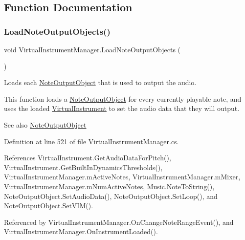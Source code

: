 \subsection{Function Documentation}
\mbox{\label{group___v_i_m_priv_func_ga8817e32cc5074737b4d9489922b0fcb8}} 
\subsubsection{\texorpdfstring{Load\+Note\+Output\+Objects()}{LoadNoteOutputObjects()}}
{\footnotesize\ttfamily void Virtual\+Instrument\+Manager.\+Load\+Note\+Output\+Objects (\begin{DoxyParamCaption}{ }\end{DoxyParamCaption})\hspace{0.3cm}{\ttfamily [private]}}



Loads each \hyperlink{class_note_output_object}{Note\+Output\+Object} that is used to output the audio. 

This function loads a \hyperlink{class_note_output_object}{Note\+Output\+Object} for every currently playable note, and uses the loaded \hyperlink{class_virtual_instrument}{Virtual\+Instrument} to set the audio data that they will output.

\begin{DoxySeeAlso}{See also}
\hyperlink{class_note_output_object}{Note\+Output\+Object} 
\end{DoxySeeAlso}


Definition at line 521 of file Virtual\+Instrument\+Manager.\+cs.



References Virtual\+Instrument.\+Get\+Audio\+Data\+For\+Pitch(), Virtual\+Instrument.\+Get\+Built\+In\+Dynamics\+Thresholds(), Virtual\+Instrument\+Manager.\+m\+Active\+Notes, Virtual\+Instrument\+Manager.\+m\+Mixer, Virtual\+Instrument\+Manager.\+m\+Num\+Active\+Notes, Music.\+Note\+To\+String(), Note\+Output\+Object.\+Set\+Audio\+Data(), Note\+Output\+Object.\+Set\+Loop(), and Note\+Output\+Object.\+Set\+V\+I\+M().



Referenced by Virtual\+Instrument\+Manager.\+On\+Change\+Note\+Range\+Event(), and Virtual\+Instrument\+Manager.\+On\+Instrument\+Loaded().


